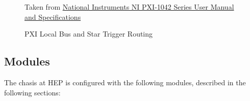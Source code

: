\begin{figure}[htbp]\begin{center}
  {\tiny
    Taken from \href{Manuals/NI PXI-1042 Series User Manual and Specifications}{National Instruments NI PXI-1042 Series User Manual and Specifications}
  }
  \caption{PXI Local Bus and Star Trigger Routing}
  \label{fig:eq_pxi:chasis_bus}
\end{center}\end{figure}

\subsection{Modules}
\label{sec:eq_pxi:modules}

The chasis at HEP is configured with the following modules, described in the following sections:

